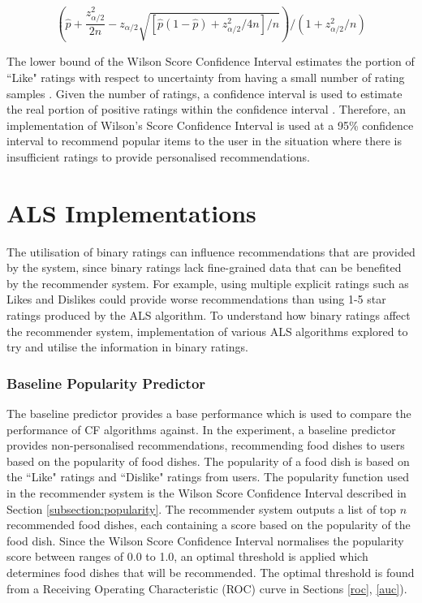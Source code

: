 \begin{equation} \label{wilson}
\left(\hat{p} + \frac{z^2_{\alpha/2}}{2n} - z_{\alpha/2} \sqrt{[\hat{p}(1-\hat{p}) + z^2_{\alpha/2}/4n]/n}\right)/(1 + z^2_{\alpha/2}/n)
\end{equation}

The lower bound of the Wilson Score Confidence Interval estimates the portion of ``Like" ratings with respect to uncertainty from having a small number of rating samples \cite{popularity}. Given the number of ratings, a confidence interval is used to estimate the real portion of positive ratings within the confidence interval \cite{popularity}. Therefore, an implementation of Wilson's Score Confidence Interval is used at a 95\% confidence interval to recommend popular items to the user in the situation where there is insufficient ratings to provide personalised recommendations.

\section{ALS Implementations} \label{algorithms}

The utilisation of binary ratings can influence recommendations that are provided by the system, since binary ratings lack fine-grained data that can be benefited by the recommender system. For example, using multiple explicit ratings such as Likes and Dislikes could provide worse recommendations than using 1-5 star ratings produced by the ALS algorithm. To understand how binary ratings affect the recommender system, implementation of various ALS algorithms explored to try and utilise the information in binary ratings.

\subsubsection{Baseline Popularity Predictor}

The baseline predictor provides a base performance which is used to compare the performance of CF algorithms against. In the experiment, a baseline predictor provides non-personalised recommendations, recommending food dishes to users based on the popularity of food dishes. The popularity of a food dish is based on the ``Like" ratings and ``Dislike" ratings from users. The popularity function used in the recommender system is the Wilson Score Confidence Interval described in Section \ref{subsection:popularity}. The recommender system outputs a list of top $n$ recommended food dishes, each containing a score based on the popularity of the food dish. Since the Wilson Score Confidence Interval normalises the popularity score between ranges of 0.0 to 1.0, an optimal threshold is applied which determines food dishes that will be recommended. The optimal threshold is found from a Receiving Operating Characteristic (ROC) curve in Sections \ref{roc}, \ref{auc}).


